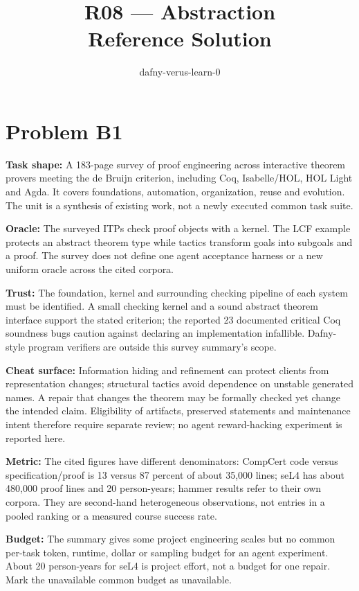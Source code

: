 \documentclass[11pt]{article}
\title{R08 --- Abstraction \\ \large Reference Solution}
\author{dafny-verus-learn-0}
\date{}
\begin{document}
\maketitle
\section*{Problem B1}\label{ans:B1}
\begin{answer}
\textbf{Task shape:} A 183-page survey of proof engineering across interactive theorem provers meeting the de Bruijn criterion, including Coq, Isabelle/HOL, HOL Light and Agda. It covers foundations, automation, organization, reuse and evolution. The unit is a synthesis of existing work, not a newly executed common task suite.

\textbf{Oracle:} The surveyed ITPs check proof objects with a kernel. The LCF example protects an abstract theorem type while tactics transform goals into subgoals and a proof. The survey does not define one agent acceptance harness or a new uniform oracle across the cited corpora.

\textbf{Trust:} The foundation, kernel and surrounding checking pipeline of each system must be identified. A small checking kernel and a sound abstract theorem interface support the stated criterion; the reported 23 documented critical Coq soundness bugs caution against declaring an implementation infallible. Dafny-style program verifiers are outside this survey summary's scope.

\textbf{Cheat surface:} Information hiding and refinement can protect clients from representation changes; structural tactics avoid dependence on unstable generated names. A repair that changes the theorem may be formally checked yet change the intended claim. Eligibility of artifacts, preserved statements and maintenance intent therefore require separate review; no agent reward-hacking experiment is reported here.

\textbf{Metric:} The cited figures have different denominators: CompCert code versus specification/proof is 13 versus 87 percent of about 35,000 lines; seL4 has about 480,000 proof lines and 20 person-years; hammer results refer to their own corpora. They are second-hand heterogeneous observations, not entries in a pooled ranking or a measured course success rate.

\textbf{Budget:} The summary gives some project engineering scales but no common per-task token, runtime, dollar or sampling budget for an agent experiment. About 20 person-years for seL4 is project effort, not a budget for one repair. Mark the unavailable common budget as unavailable.


\end{answer}
\end{document}
